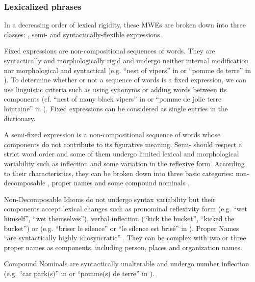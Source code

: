 \documentclass[output=paper,modfonts,nonflat]{langsci/langscibook}
\begin{document}
\subsubsection{Lexicalized phrases}
In a decreasing order of lexical rigidity, these MWEs are broken down into three classes: , semi- and syntactically-flexible expressions.

Fixed expressions are non-compositional sequences of words.
They are syntactically and morphologically rigid and undergo neither internal modification nor morphological and syntactical  (e.g. ``nest of vipers'' in  or ``pom\-me de terre'' in  ).
To determine whether or not a sequence of words is a fixed expression, we can use linguistic criteria such as using synonyms or adding words between its components (cf. ``nest of many black vipers'' in  or ``pomme de jolie terre lointaine'' in ).
Fixed expressions can be considered as single entries in the dictionary.

A semi-fixed expression is a non-compositional sequence of words whose components do not contribute to its figurative meaning.
Semi- should respect a strict word order and some of them undergo limited lexical and morphological variability such as inflection and some variation in the reflexive form.
According to their characteristics, they can be broken down into three basic categories: non-decomposable , proper names and some compound nominals \citep{sag02}.

Non-Decomposable Idioms do not undergo syntax variability but their components accept lexical changes such as pronominal reflexivity form (e.g. ``wet himself'', ``wet themselves''), verbal inflection (``kick the bucket'', ``kicked the bucket'') or  (e.g. ``briser le silence'' or  ``le silence est brisé'' in ).
Proper Names ``are syntactically highly idiosyncratic'' \citep{sag02}.
They can be complex with two or three proper names as components, including person, places and organization names.

Compound Nominals are syntactically unalterable and undergo number inflection (e.g. ``car park(s)'' in  or ``pomme(s) de terre'' in ).

\end{document}
